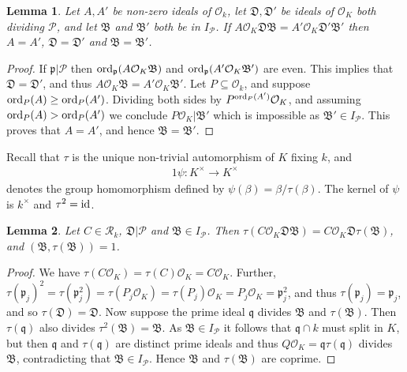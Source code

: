 \documentclass[11pt]{amsart}
\newtheorem{lemma}{Lemma}[section]
\numberwithin{equation}{eqncounter}
\def\Pc{\mathcal{P}}
\def\R{\mathcal{R}}
\def\p{\mathfrak{p}}
\def\q{\mathfrak{q}}
\def\B{\mathfrak{B}}
\def\D{\mathfrak{D}}
\def\id{\mathop{\rm id}\nolimits}
\def\ord{\mathop{\rm ord}\nolimits}
\def\Oseen{{\mathcal{O}}}
\begin{document}
\begin{lemma}\label{lem: uniquedecomposition}
Let $A,A'$ be non-zero ideals of $\Oseen_k$, let $\D,\D'$ be ideals of $\Oseen_K$ both dividing $\Pc$, and let $\B$ and $\B'$ both be in $I_\Pc$.
If $A\Oseen_K\D\B=A'\Oseen_K\D'\B'$ then $A=A'$, $\D=\D'$ and $\B=\B'$.
\end{lemma}
\begin{proof}
If  $\p|\Pc$ then $\ord_\p(A\Oseen_K\B)$ and $\ord_\p(A'\Oseen_K\B')$ are even.
This implies that $\D=\D'$, and thus 
$A\Oseen_K\B=A'\Oseen_K\B'$. Let $P\subseteq \Oseen_k$, and suppose $\ord_P(A)\geq \ord_P(A')$.
Dividing both sides by $P^{\ord_P(A')}\Oseen_K$, and assuming $\ord_P(A)> \ord_P(A')$ we conclude
$P\Oseen_K|\B'$ which is impossible as $\B'\in I_\Pc$.
This proves that $A=A'$, and hence $\B=\B'$.
\end{proof}







Recall that $\tau$ is the unique non-trivial automorphism of $K$ fixing $k$, and  
\begin{alignat}1\label{map: psi}
\psi:K^\times\to K^\times
\end{alignat}
denotes the group homomorphism
defined by $\psi(\beta)=\beta/\tau(\beta)$.
The kernel of $\psi$ is  $k^\times$ and $\tau^2=\id$.


\begin{lemma}\label{lem: BtauB}
Let $C\in \R_k$, $\D|\Pc$ and $\B\in I_\Pc$. Then $\tau(C\Oseen_K\D\B)=C\Oseen_K\D\tau(\B)$, and $(\B,\tau(\B))=1$.
\end{lemma}
\begin{proof}
We have
$\tau(C\Oseen_K)=\tau(C)\Oseen_K=C\Oseen_K$. Further, $\tau(\p_j)^2
=\tau(\p_j^2)=\tau(P_j\Oseen_K)=\tau(P_j)\Oseen_K=P_j\Oseen_K=\p_j^2$, 
and thus $\tau(\p_j)=\p_j$, and so $\tau(\D)=\D$. 
Now suppose the prime ideal $\q$ divides $\B$ and $\tau(\B)$. Then $\tau(\q)$ also divides $\tau^2(\B)=\B$. As $\B\in I_\Pc$ it follows that
$\q\cap k$ must split in $K$, but then $\q$ and $\tau(\q)$ are distinct prime ideals and thus
$Q\Oseen_K=\q\tau(\q)$ divides $\B$, contradicting  that $\B\in I_\Pc$. Hence $\B$ and $\tau(\B)$ are coprime.
\end{proof}
\end{document}
